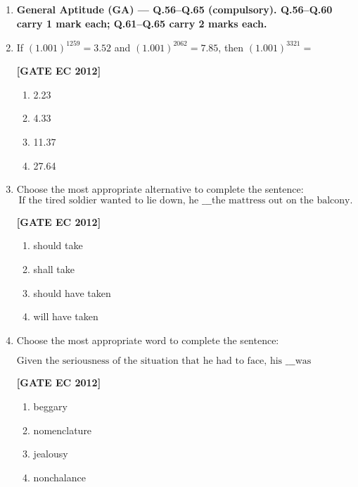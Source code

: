 \documentclass[12pt]{article}
\begin{document}
\begin{enumerate}[leftmargin=1.0em, label=\textbf{Q.\arabic*.}, itemsep=2em]
\begin{enumerate}[leftmargin=2.5em, label=\textbf{Q.\arabic*.}, itemsep=2em, start=46]
\item[] \textbf{General Aptitude (GA) — Q.56–Q.65 (compulsory). Q.56–Q.60 carry 1 mark each; Q.61–Q.65 carry 2 marks each.}

\item If $(1.001)^{1259}=3.52$ and $(1.001)^{2062}=7.85$, then $(1.001)^{3321}=$

\noindent \textbf{[GATE EC 2012]}
\begin{multicols}{2}
    \begin{enumerate}[label=\alph*.]
        \item 2.23
        \item 4.33
        \item 11.37
        \item 27.64
    \end{enumerate}
\end{multicols}

\item Choose the most appropriate alternative to complete the sentence:
\[
\text{If the tired soldier wanted to lie down, he \_\_\_ the mattress out on the balcony.}
\]

\noindent \textbf{[GATE EC 2012]}
\begin{multicols}{2}
    \begin{enumerate}[label=\alph*.]
        \item should take
        \item shall take
        \item should have taken
        \item will have taken
    \end{enumerate}
\end{multicols}

\item Choose the most appropriate word to complete the sentence:

\[
\text{Given the seriousness of the situation that he had to face, his \_\_\_ was impressive.}
\]

\noindent \textbf{[GATE EC 2012]}
\begin{multicols}{2}
    \begin{enumerate}[label=\alph*.]
        \item beggary
        \item nomenclature
        \item jealousy
        \item nonchalance
    \end{enumerate}
\end{multicols}


\end{enumerate}
\end{enumerate}
\end{document}
